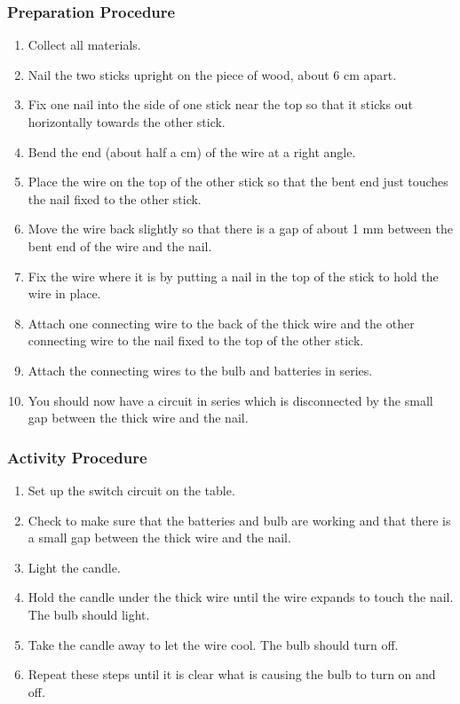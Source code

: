 \subsubsection*{Preparation Procedure}
\begin{enumerate}
\item{Collect all materials.} 
\item{Nail the two sticks upright on the piece of wood, about 6 cm apart.} 
\item{Fix one nail into the side of one stick near the top so that it sticks out horizontally towards the other stick.} 
\item{Bend the end (about half a cm) of the wire at a right angle.} 
\item{Place the wire on the top of the other stick so that the bent end just touches the nail fixed to the other stick.} 
\item{Move the wire back slightly so that there is a gap of about 1 mm between the bent end of the wire and the nail.} 
\item{Fix the wire where it is by putting a nail in the top of the stick to hold the wire in place.} 
\item{Attach one connecting wire to the back of the thick wire and the other connecting wire to the nail fixed to the top of the other stick.} 
\item{Attach the connecting wires to the bulb and batteries in series.} 
\item{You should now have a circuit in series which is disconnected by the small gap between the thick wire and the nail.} 
\end{enumerate}

\subsubsection*{Activity Procedure}
\begin{enumerate}
\item{Set up the switch circuit on the table.} 
\item{Check to make sure that the batteries and bulb are working and that there is a small gap between the thick wire and the nail.} 
\item{Light the candle.} 
\item{Hold the candle under the thick wire until the wire expands to touch the nail. The bulb should light.} 
\item{Take the candle away to let the wire cool. The bulb should turn off.} 
\item{Repeat these steps until it is clear what is causing the bulb to turn on and off.} 
\end{enumerate}

